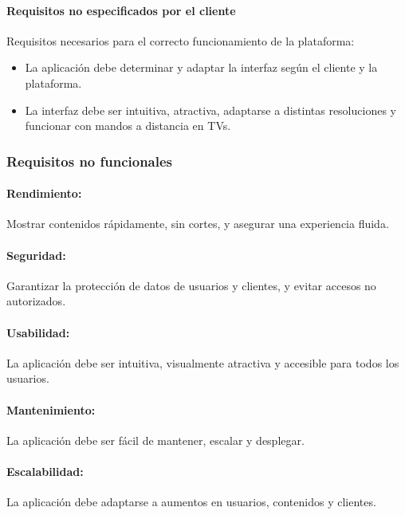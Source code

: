 \paragraph{Requisitos no especificados por el cliente}
\label{par:analisis_requisitos_funcionales_no_cliente}

Requisitos necesarios para el correcto funcionamiento de la plataforma:

\begin{itemize}
    \item La aplicación debe determinar y adaptar la interfaz según el cliente y la plataforma.
    \item La interfaz debe ser intuitiva, atractiva, adaptarse a distintas resoluciones y funcionar con mandos a distancia en TVs.
\end{itemize}

\subsubsection{Requisitos no funcionales}
\label{subsubsec:analisis_requisitos_no_funcionales}

\paragraph{Rendimiento:} Mostrar contenidos rápidamente, sin cortes, y asegurar una experiencia fluida.

\paragraph{Seguridad:} Garantizar la protección de datos de usuarios y clientes, y evitar accesos no autorizados.

\paragraph{Usabilidad:} La aplicación debe ser intuitiva, visualmente atractiva y accesible para todos los usuarios.

\paragraph{Mantenimiento:} La aplicación debe ser fácil de mantener, escalar y desplegar.

\paragraph{Escalabilidad:} La aplicación debe adaptarse a aumentos en usuarios, contenidos y clientes.


